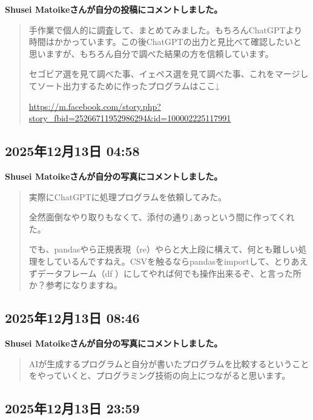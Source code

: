 \textbf{Shusei Matoikeさんが自分の投稿にコメントしました。}

\begin{quote}
手作業で個人的に調査して、まとめてみました。もちろんChatGPTより時間はかかっています。この後ChatGPTの出力と見比べて確認したいと思いますが、もちろん自分で調べた結果の方を信頼しています。

セゴビア選を見て調べた事、イェペス選を見て調べた事、これをマージしてソート出力するために作ったプログラムはここ↓

\url{https://m.facebook.com/story.php?story_fbid=25266711952986294&id=100002225117991}
\end{quote}

\subsection*{2025年12月13日 04:58}

\textbf{Shusei Matoikeさんが自分の写真にコメントしました。}

\begin{quote}
実際にChatGPTに処理プログラムを依頼してみた。

全然面倒なやり取りもなくて、添付の通り↓あっという間に作ってくれた。

でも、pandasやら正規表現（re）やらと大上段に構えて、何とも難しい処理をしているんですねえ。CSVを触るならpandasをimportして、とりあえずデータフレーム（df ）にしてやれば何でも操作出来るぞ、と言った所か？参考になりますね。
\end{quote}

\subsection*{2025年12月13日 08:46}

\textbf{Shusei Matoikeさんが自分の写真にコメントしました。}

\begin{quote}
AIが生成するプログラムと自分が書いたプログラムを比較するということをやっていくと、プログラミング技術の向上につながると思います。
\end{quote}

\subsection*{2025年12月13日 23:59}

